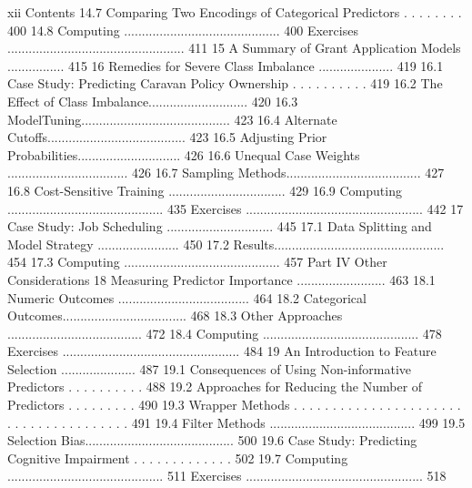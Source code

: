 xii Contents
14.7 Comparing Two Encodings of Categorical Predictors . . . . . . . . 400 14.8 Computing ............................................ 400 Exercises .................................................. 411
15 A Summary of Grant Application Models ................ 415
16 Remedies for Severe Class Imbalance ..................... 419 16.1 Case Study: Predicting Caravan Policy Ownership . . . . . . . . . . 419 16.2 The Effect of Class Imbalance............................ 420 16.3 ModelTuning.......................................... 423 16.4 Alternate Cutoffs....................................... 423 16.5 Adjusting Prior Probabilities............................. 426 16.6 Unequal Case Weights .................................. 426 16.7 Sampling Methods...................................... 427 16.8 Cost-Sensitive Training ................................. 429 16.9 Computing ............................................ 435 Exercises .................................................. 442
17 Case Study: Job Scheduling .............................. 445 17.1 Data Splitting and Model Strategy ....................... 450 17.2 Results................................................ 454 17.3 Computing ............................................ 457
Part IV Other Considerations
18 Measuring Predictor Importance ......................... 463 18.1 Numeric Outcomes ..................................... 464 18.2 Categorical Outcomes................................... 468 18.3 Other Approaches ...................................... 472 18.4 Computing ............................................ 478 Exercises .................................................. 484
19 An Introduction to Feature Selection ..................... 487 19.1 Consequences of Using Non-informative Predictors . . . . . . . . . . 488 19.2 Approaches for Reducing the Number of Predictors . . . . . . . . . 490 19.3 Wrapper Methods . . . . . . . . . . . . . . . . . . . . . . . . . . . . . . . . . . . . . . 491 19.4 Filter Methods ......................................... 499 19.5 Selection Bias.......................................... 500 19.6 Case Study: Predicting Cognitive Impairment . . . . . . . . . . . . . 502 19.7 Computing ............................................ 511 Exercises .................................................. 518


